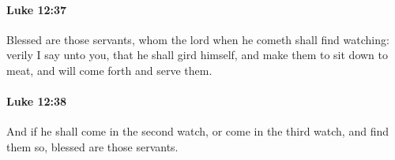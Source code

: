 		\paragraph{Luke 12:37} %
			\label{LUKE-12-37}

			Blessed are those servants, whom the lord when he cometh shall find watching: verily I say unto you, that he shall gird himself, and make them to sit down to meat, and will come forth and serve them.

			\begin{framed}
			\scriptsize
				\begin{compactdesc}
					\item[SBLG] 
				\end{compactdesc}
			\end{framed}

		\paragraph{Luke 12:38} %
			\label{LUKE-12-38}

			And if he shall come in the second watch, or come in the third watch, and find them so, blessed are those servants.

